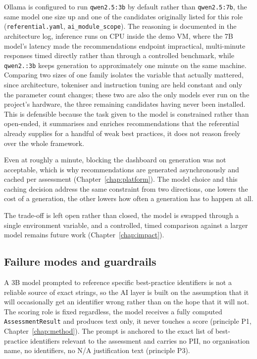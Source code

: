 Ollama is configured to run \texttt{qwen2.5:3b} by default rather than
\texttt{qwen2.5:7b}, the same model one size up and one of the candidates
originally listed for this role (\texttt{referential.yaml},
\texttt{ai\_module\_scope}). The reasoning is documented in the architecture
log, inference runs on CPU inside the demo VM, where the 7B model's latency
made the recommendations endpoint impractical, multi-minute responses timed
directly rather than through a controlled benchmark, while
\texttt{qwen2.:\allowbreak 3b} keeps generation to approximately one minute on the same
machine. Comparing two sizes of one family isolates the variable that actually
mattered, since architecture, tokeniser and instruction tuning are held constant
and only the parameter count changes; these two are also the only models ever run
on the project's hardware, the three remaining candidates having never been
installed. This
is defensible because the task given to the model is constrained rather
than open-ended, it summarises and enriches recommendations that the
referential already supplies for a handful of weak best practices, it does
not reason freely over the whole framework.

Even at roughly a minute, blocking the dashboard on generation was not
acceptable, which is why recommendations are generated asynchronously and
cached per assessment (Chapter~\ref{chap:platform}). The model
choice and this caching decision address the same constraint from two
directions, one lowers the cost of a generation, the other lowers how often a
generation has to happen at all.

The trade-off is left open rather than closed, the model is swapped through a
single environment variable, and a controlled, timed comparison against a
larger model remains future work (Chapter~\ref{chap:impact}).

\subsection{Failure modes and guardrails}
\label{sec:validation-failure-modes}

A 3B model prompted to reference specific best-practice identifiers is not a
reliable source of exact strings, so the AI layer is built on the assumption
that it will occasionally get an identifier wrong rather than on the hope
that it will not. The scoring role is fixed regardless, the model receives a
fully computed \texttt{AssessmentResult} and produces text only, it never
touches a score (principle P1, Chapter~\ref{chap:method}). The prompt is
anchored to the exact list of best-practice identifiers relevant to the
assessment and carries no PII, no organisation name, no identifiers, no
N/A justification text (principle P3).

